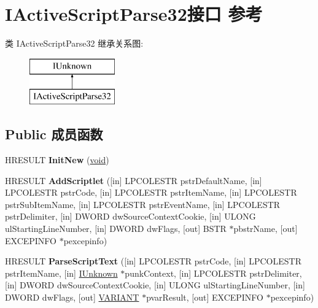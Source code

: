\hypertarget{interface_i_active_script_parse32}{}\section{I\+Active\+Script\+Parse32接口 参考}
\label{interface_i_active_script_parse32}
类 I\+Active\+Script\+Parse32 继承关系图\+:\begin{figure}[H]
\begin{center}
\leavevmode
\includegraphics[height=2.000000cm]{interface_i_active_script_parse32}
\end{center}
\end{figure}
\subsection*{Public 成员函数}
\begin{DoxyCompactItemize}
\item 
\mbox{\label{interface_i_active_script_parse32_a355f7b7eed420e110f8b981b463be91e}} 
H\+R\+E\+S\+U\+LT {\bfseries Init\+New} (\hyperlink{interfacevoid}{void})
\item 
\mbox{\label{interface_i_active_script_parse32_abfcc7d74fc82393ee440aa298eacd676}} 
H\+R\+E\+S\+U\+LT {\bfseries Add\+Scriptlet} (\mbox{[}in\mbox{]} L\+P\+C\+O\+L\+E\+S\+TR pstr\+Default\+Name, \mbox{[}in\mbox{]} L\+P\+C\+O\+L\+E\+S\+TR pstr\+Code, \mbox{[}in\mbox{]} L\+P\+C\+O\+L\+E\+S\+TR pstr\+Item\+Name, \mbox{[}in\mbox{]} L\+P\+C\+O\+L\+E\+S\+TR pstr\+Sub\+Item\+Name, \mbox{[}in\mbox{]} L\+P\+C\+O\+L\+E\+S\+TR pstr\+Event\+Name, \mbox{[}in\mbox{]} L\+P\+C\+O\+L\+E\+S\+TR pstr\+Delimiter, \mbox{[}in\mbox{]} D\+W\+O\+RD dw\+Source\+Context\+Cookie, \mbox{[}in\mbox{]} U\+L\+O\+NG ul\+Starting\+Line\+Number, \mbox{[}in\mbox{]} D\+W\+O\+RD dw\+Flags, \mbox{[}out\mbox{]} B\+S\+TR $\ast$pbstr\+Name, \mbox{[}out\mbox{]} E\+X\+C\+E\+P\+I\+N\+FO $\ast$pexcepinfo)
\item 
\mbox{\label{interface_i_active_script_parse32_a78e223c175b85863cf09d9940b5018f4}} 
H\+R\+E\+S\+U\+LT {\bfseries Parse\+Script\+Text} (\mbox{[}in\mbox{]} L\+P\+C\+O\+L\+E\+S\+TR pstr\+Code, \mbox{[}in\mbox{]} L\+P\+C\+O\+L\+E\+S\+TR pstr\+Item\+Name, \mbox{[}in\mbox{]} \hyperlink{interface_i_unknown}{I\+Unknown} $\ast$punk\+Context, \mbox{[}in\mbox{]} L\+P\+C\+O\+L\+E\+S\+TR pstr\+Delimiter, \mbox{[}in\mbox{]} D\+W\+O\+RD dw\+Source\+Context\+Cookie, \mbox{[}in\mbox{]} U\+L\+O\+NG ul\+Starting\+Line\+Number, \mbox{[}in\mbox{]} D\+W\+O\+RD dw\+Flags, \mbox{[}out\mbox{]} \hyperlink{structtag_v_a_r_i_a_n_t}{V\+A\+R\+I\+A\+NT} $\ast$pvar\+Result, \mbox{[}out\mbox{]} E\+X\+C\+E\+P\+I\+N\+FO $\ast$pexcepinfo)
\end{DoxyCompactItemize}
